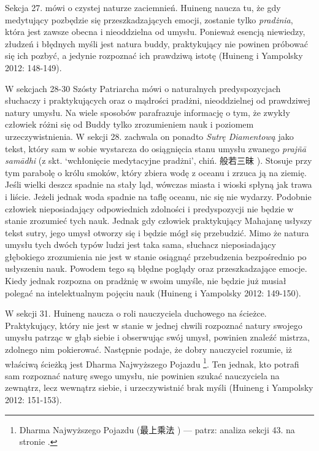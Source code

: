Sekcja 27. mówi o czystej naturze zaciemnień.
Huineng naucza tu, że gdy medytujący pozbędzie się przeszkadzających emocji, zostanie tylko \textit{pradżnia}, która jest zawsze obecna i nieoddzielna od umysłu.
Ponieważ esencją niewiedzy, złudzeń i błędnych myśli jest natura buddy, praktykujący nie powinen próbować się ich pozbyć, a jedynie rozpoznać ich prawdziwą istotę
(Huineng i Yampolsky 2012: 148-149).

W sekcjach 28-30 Szósty Patriarcha mówi o naturalnych predyspozycjach słuchaczy i praktykujących oraz o mądrości pradżni, nieoddzielnej od prawdziwej natury umysłu.
Na wiele sposobów parafrazuje informację o tym, że zwykły człowiek różni się od Buddy tylko zrozumieniem nauk i poziomem urzeczywistnienia.
W sekcji 28. zachwala on ponadto \textit{Sutrę Diamentową} jako tekst, który sam w sobie wystarcza do osiągnięcia stanu umysłu zwanego \textit{prajñā samādhi} (z skt. `wchłonięcie medytacyjne pradżni', chiń. 般若三昧 ).
Stosuje przy tym parabolę o królu smoków, który zbiera wodę z oceanu i zrzuca ją na ziemię.
Jeśli wielki deszcz spadnie na stały ląd, wówczas miasta i wioski spłyną jak trawa i liście.
Jeżeli jednak woda spadnie na taflę oceanu, nic się nie wydarzy.
Podobnie człowiek nieposiadający odpowiednich zdolności i predyspozycji nie będzie w stanie zrozumieć tych nauk.
Jednak gdy człowiek praktykujący Mahajanę usłyszy tekst sutry, jego umysł otworzy się i będzie mógł się przebudzić.
Mimo że natura umysłu tych dwóch typów ludzi jest taka sama, słuchacz nieposiadający głębokiego zrozumienia nie jest w stanie osiągnąć przebudzenia bezpośrednio po usłyszeniu nauk.
Powodem tego są błędne poglądy oraz przeszkadzające emocje.
Kiedy jednak rozpozna on pradżnię w swoim umyśle, nie będzie już musiał polegać na intelektualnym pojęciu nauk
(Huineng i Yampolsky 2012: 149-150).

W sekcji 31. Huineng naucza o roli nauczyciela duchowego na ścieżce.
Praktykujący, który nie jest w stanie w jednej chwili rozpoznać natury swojego umysłu patrząc w głąb siebie i obserwując swój umysł, powinien znaleźć mistrza, zdolnego nim pokierować.
Następnie podaje, że dobry nauczyciel rozumie, iż właściwą ścieżką jest Dharma Najwyższego Pojazdu%
\footnote{Dharma Najwyższego Pojazdu (最上乘法 ) --- patrz: analiza sekcji 43. na stronie \pageref{SiChengFa}.}.%
Ten jednak, kto potrafi sam rozpoznać naturę swego umysłu, nie powinien szukać nauczyciela na zewnątrz, lecz wewnątrz siebie, i urzeczywistnić brak myśli
(Huineng i Yampolsky 2012: 151-153).

